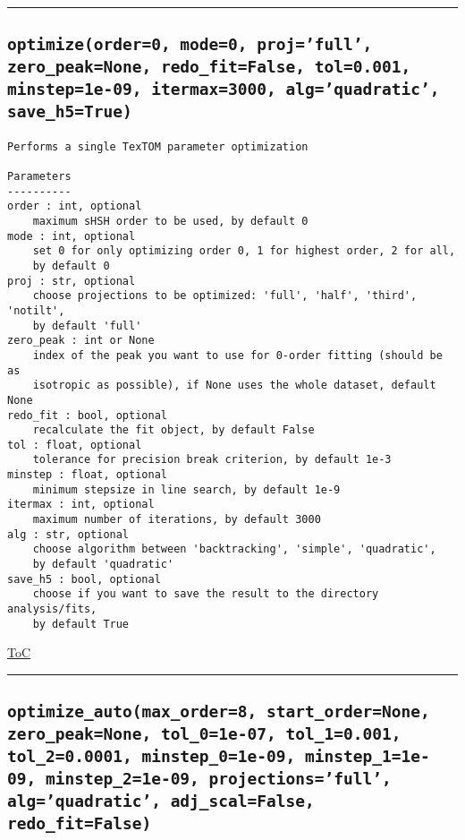 \documentclass{article}
\begin{document}


\vspace{5mm}

\hrule

\subsection*{\texttt{optimize(order=0, mode=0, proj='full', zero\_peak=None, redo\_fit=False, tol=0.001, minstep=1e-09, itermax=3000, alg='quadratic', save\_h5=True)}}

\begin{lstlisting}[language=docstring]
Performs a single TexTOM parameter optimization

Parameters
----------
order : int, optional
    maximum sHSH order to be used, by default 0
mode : int, optional
    set 0 for only optimizing order 0, 1 for highest order, 2 for all,
    by default 0
proj : str, optional
    choose projections to be optimized: 'full', 'half', 'third', 'notilt', 
    by default 'full'
zero_peak : int or None
    index of the peak you want to use for 0-order fitting (should be as
    isotropic as possible), if None uses the whole dataset, default None
redo_fit : bool, optional
    recalculate the fit object, by default False
tol : float, optional
    tolerance for precision break criterion, by default 1e-3
minstep : float, optional
    minimum stepsize in line search, by default 1e-9
itermax : int, optional
    maximum number of iterations, by default 3000
alg : str, optional
    choose algorithm between 'backtracking', 'simple', 'quadratic', 
    by default 'quadratic'
save_h5 : bool, optional
    choose if you want to save the result to the directory analysis/fits, 
    by default True    
\end{lstlisting}

\begin{flushright}

\hyperref[toc]{ToC}

\end{flushright}



\vspace{5mm}

\hrule

\subsection*{\texttt{optimize\_auto(max\_order=8, start\_order=None, zero\_peak=None, tol\_0=1e-07, tol\_1=0.001, tol\_2=0.0001, minstep\_0=1e-09, minstep\_1=1e-09, minstep\_2=1e-09, projections='full', alg='quadratic', adj\_scal=False, redo\_fit=False)}}
\end{document}
